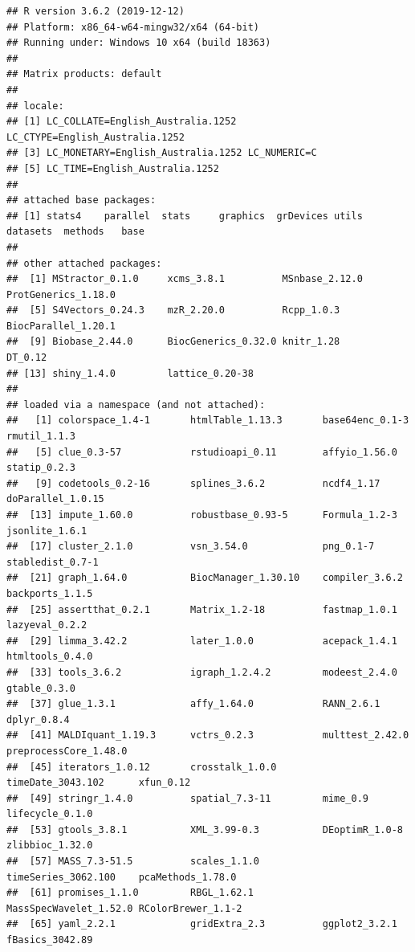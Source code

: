 \documentclass[
]{article}
\begin{document}
\begin{verbatim}
## R version 3.6.2 (2019-12-12)
## Platform: x86_64-w64-mingw32/x64 (64-bit)
## Running under: Windows 10 x64 (build 18363)
## 
## Matrix products: default
## 
## locale:
## [1] LC_COLLATE=English_Australia.1252  LC_CTYPE=English_Australia.1252   
## [3] LC_MONETARY=English_Australia.1252 LC_NUMERIC=C                      
## [5] LC_TIME=English_Australia.1252    
## 
## attached base packages:
## [1] stats4    parallel  stats     graphics  grDevices utils     datasets  methods   base     
## 
## other attached packages:
##  [1] MStractor_0.1.0     xcms_3.8.1          MSnbase_2.12.0      ProtGenerics_1.18.0
##  [5] S4Vectors_0.24.3    mzR_2.20.0          Rcpp_1.0.3          BiocParallel_1.20.1
##  [9] Biobase_2.44.0      BiocGenerics_0.32.0 knitr_1.28          DT_0.12            
## [13] shiny_1.4.0         lattice_0.20-38    
## 
## loaded via a namespace (and not attached):
##   [1] colorspace_1.4-1       htmlTable_1.13.3       base64enc_0.1-3        rmutil_1.1.3          
##   [5] clue_0.3-57            rstudioapi_0.11        affyio_1.56.0          statip_0.2.3          
##   [9] codetools_0.2-16       splines_3.6.2          ncdf4_1.17             doParallel_1.0.15     
##  [13] impute_1.60.0          robustbase_0.93-5      Formula_1.2-3          jsonlite_1.6.1        
##  [17] cluster_2.1.0          vsn_3.54.0             png_0.1-7              stabledist_0.7-1      
##  [21] graph_1.64.0           BiocManager_1.30.10    compiler_3.6.2         backports_1.1.5       
##  [25] assertthat_0.2.1       Matrix_1.2-18          fastmap_1.0.1          lazyeval_0.2.2        
##  [29] limma_3.42.2           later_1.0.0            acepack_1.4.1          htmltools_0.4.0       
##  [33] tools_3.6.2            igraph_1.2.4.2         modeest_2.4.0          gtable_0.3.0          
##  [37] glue_1.3.1             affy_1.64.0            RANN_2.6.1             dplyr_0.8.4           
##  [41] MALDIquant_1.19.3      vctrs_0.2.3            multtest_2.42.0        preprocessCore_1.48.0 
##  [45] iterators_1.0.12       crosstalk_1.0.0        timeDate_3043.102      xfun_0.12             
##  [49] stringr_1.4.0          spatial_7.3-11         mime_0.9               lifecycle_0.1.0       
##  [53] gtools_3.8.1           XML_3.99-0.3           DEoptimR_1.0-8         zlibbioc_1.32.0       
##  [57] MASS_7.3-51.5          scales_1.1.0           timeSeries_3062.100    pcaMethods_1.78.0     
##  [61] promises_1.1.0         RBGL_1.62.1            MassSpecWavelet_1.52.0 RColorBrewer_1.1-2    
##  [65] yaml_2.2.1             gridExtra_2.3          ggplot2_3.2.1          fBasics_3042.89       

\end{verbatim}
\end{document}
